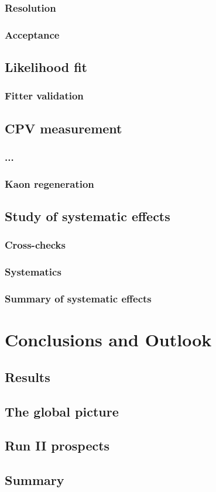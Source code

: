 \subsection{Resolution}
\subsection{Acceptance}
\section{Likelihood fit}
\subsection{Fitter validation}
\section{CPV measurement}
\subsection{...}
\subsection{Kaon regeneration}
\section{Study of systematic effects}
\subsection{Cross-checks}
\subsection{Systematics}
\subsection{Summary of systematic effects}

\chapter{Conclusions and Outlook}
\section{Results}
\section{The global picture}
\section{Run II prospects}
\section{Summary}

